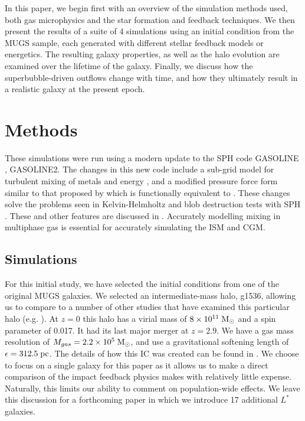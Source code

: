 In this paper, we begin first with an overview of the simulation methods used,
both gas microphysics and the star formation and feedback techniques.  We then
present the results of a suite of 4 simulations using an initial
condition from the MUGS sample, each generated with different stellar feedback
models or energetics.  The resulting galaxy properties,  as well as the halo
evolution are examined over the lifetime of the galaxy.  Finally, we discuss how
the superbubble-driven outflows change with time, and how they ultimately result
in a realistic galaxy at the present epoch.

\section{Methods}

These simulations were run using a modern update to the SPH code {\sc GASOLINE}
\citep{Wadsley2004}, {\sc GASOLINE2}.  The changes in this new code include a
sub-grid model for turbulent mixing of metals and energy \citep{Shen2010}, and a
modified pressure force form similar to that proposed by \citet{Ritchie2001}
which is functionally equivalent to \cite{Hopkins2013}.  These changes solve the
problems seen in Kelvin-Helmholtz and blob destruction tests with SPH
\citep{Agertz2007}.  These and other features are discussed in
\citet{Keller2014}.  Accurately modelling mixing in multiphase gas is essential
for accurately simulating the ISM and CGM.

\subsection{Simulations}
For this initial study, we have selected the initial conditions from one of the
original MUGS galaxies. We selected an intermediate-mass halo, g1536, allowing
us to compare to a number of other studies that have examined this particular
halo (e.g. \citealt{Stinson2013,Woods2014}).  At $z=0$ this halo has a virial
mass of $8\times10^{11}\; \rm{M_\odot}$ and a spin parameter of 0.017.  It had
its last major merger at $z=2.9$.  We have a gas mass resolution of
$M_{gas}=2.2\times10^5\; \rm{M_{\odot}}$, and use a gravitational softening
length of $\epsilon=312.5\; \rm{pc}$.  The details of how this IC was created
can be found in \citet{Stinson2010}.  We choose to focus on a single galaxy for
this paper as it allows us to make a direct comparison of the impact feedback
physics makes with relatively little expense.  Naturally, this limits our
ability to comment on population-wide effects.  We leave this discussion
for a forthcoming paper in which we introduce 17 additional $L^*$ galaxies.

